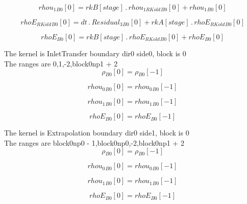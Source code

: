 \documentclass{article}
\begin{document}
\begin{dmath}{rhou_{1}{_{B0}}}[{0}] = {rkB}[{stage}] \,.\, {rhou_{1 RKold}{_{B0}}}[{0}] + {rhou_{1}{_{B0}}}[{0}]\end{dmath}

\begin{dmath}{rhoE_{RKold}{_{B0}}}[{0}] = dt \,.\, {Residual_{3}{_{B0}}}[{0}] + {rkA}[{stage}] \,.\, {rhoE_{RKold}{_{B0}}}[{0}]\end{dmath}

\begin{dmath}{rhoE{_{B0}}}[{0}] = {rkB}[{stage}] \,.\, {rhoE_{RKold}{_{B0}}}[{0}] + {rhoE{_{B0}}}[{0}]\end{dmath}

\noindent The kernel is InletTransfer boundary dir0 side0, block is 0\\\noindent The ranges are 0,1,-2,block0np1 + 2\\\begin{dmath}{\rho{_{B0}}}[{0}] = {\rho{_{B0}}}[{-1}]\end{dmath}

\begin{dmath}{rhou_{0}{_{B0}}}[{0}] = {rhou_{0}{_{B0}}}[{-1}]\end{dmath}

\begin{dmath}{rhou_{1}{_{B0}}}[{0}] = {rhou_{1}{_{B0}}}[{-1}]\end{dmath}

\begin{dmath}{rhoE{_{B0}}}[{0}] = {rhoE{_{B0}}}[{-1}]\end{dmath}

\noindent The kernel is Extrapolation boundary dir0 side1, block is 0\\\noindent The ranges are block0np0 - 1,block0np0,-2,block0np1 + 2\\\begin{dmath}{\rho{_{B0}}}[{0}] = {\rho{_{B0}}}[{-1}]\end{dmath}

\begin{dmath}{rhou_{0}{_{B0}}}[{0}] = {rhou_{0}{_{B0}}}[{-1}]\end{dmath}

\begin{dmath}{rhou_{1}{_{B0}}}[{0}] = {rhou_{1}{_{B0}}}[{-1}]\end{dmath}

\begin{dmath}{rhoE{_{B0}}}[{0}] = {rhoE{_{B0}}}[{-1}]\end{dmath}
\end{document}
